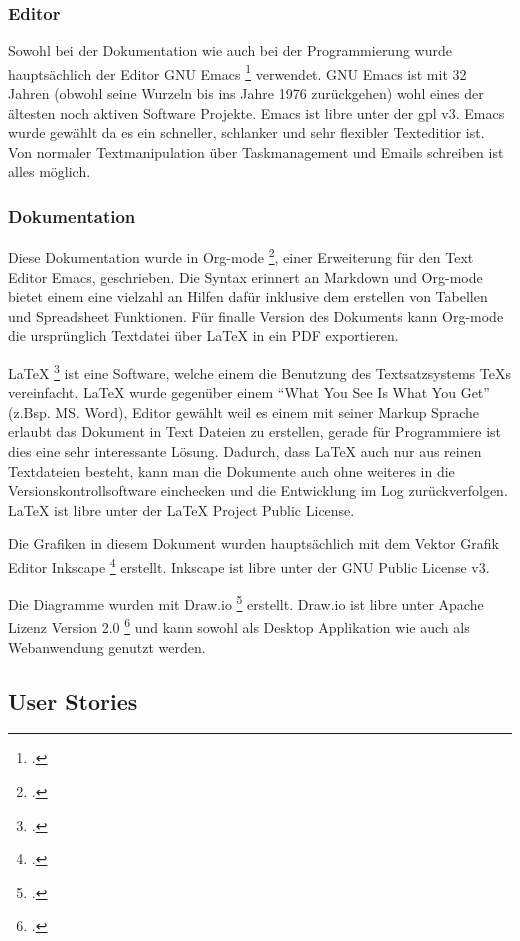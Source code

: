 \subsubsection{Editor}
\label{sec:org3519e9e}

Sowohl bei der Dokumentation wie auch bei der Programmierung wurde
hauptsächlich der Editor GNU Emacs \footcite{emacs} verwendet. GNU Emacs ist mit
32 Jahren (obwohl seine Wurzeln bis ins Jahre 1976 zurückgehen) wohl eines der
ältesten noch aktiven Software Projekte. Emacs ist \gls{libre} unter der
\gls{gpl} v3. Emacs wurde gewählt da es ein schneller, schlanker und sehr
flexibler Texteditior ist. Von normaler Textmanipulation über Taskmanagement
und Emails schreiben ist alles möglich.

\subsubsection{Dokumentation}
\label{sec:org3761443}

Diese Dokumentation wurde in Org-mode \footcite{orgmode}, einer Erweiterung für
den Text Editor Emacs, geschrieben. Die Syntax erinnert an Markdown und
Org-mode bietet einem eine vielzahl an Hilfen dafür inklusive dem erstellen von
Tabellen und Spreadsheet Funktionen. Für finalle Version des Dokuments kann
Org-mode die ursprünglich Textdatei über \LaTeX{} in ein PDF exportieren.

\LaTeX{} \footcite{latex} ist eine Software, welche einem die Benutzung des
Textsatzsystems TeXs vereinfacht. \LaTeX{} wurde gegenüber einem "`What You See Is
What You Get"' (z.Bsp. MS. Word), Editor gewählt weil es einem mit seiner Markup
Sprache erlaubt das Dokument in Text Dateien zu erstellen, gerade für
Programmiere ist dies eine sehr interessante Lösung. Dadurch, dass \LaTeX{} auch
nur aus reinen Textdateien besteht, kann man die Dokumente auch ohne weiteres
in die Versionskontrollsoftware einchecken und die Entwicklung im Log
zurückverfolgen. \LaTeX{} ist \gls{libre} unter der \LaTeX{} Project Public
License.

Die Grafiken in diesem Dokument wurden hauptsächlich mit dem Vektor Grafik
Editor Inkscape \footcite{inkscape} erstellt. Inkscape ist \gls{libre} unter der
GNU Public License v3.

Die Diagramme wurden mit Draw.io \footcite{draw} erstellt. Draw.io ist \gls{libre}
unter Apache Lizenz Version 2.0 \footcite{apache} und kann sowohl als Desktop
Applikation wie auch als Webanwendung genutzt werden.

\subsection{User Stories}
\label{sec:org8b5f298}

